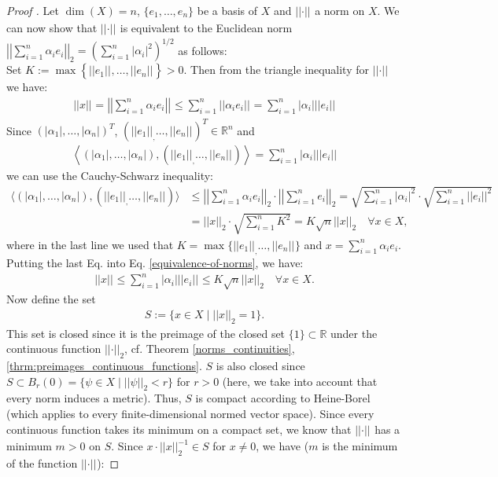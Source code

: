 \documentclass[12pt, a4paper]{article}
\numberwithin{equation}{section}
\theoremstyle{definition}
\theoremstyle{definition}
\newcommand{\norm}[2]{\left\vert\left\vert #1 \right\vert\right\vert_{#2}}
\newcommand{\abs}[1]{\left\vert #1 \right\vert}
\begin{document}
	\begin{proof}[Proof \cite{werner-fa}] Let $\dim(X) = n$, $\{e_1, \dots, e_n\}$ be a basis of $X$ and $\norm{\cdot}{}$ a norm on $X$. We can now show that $\norm{\cdot}{}$ is equivalent to the Euclidean norm $\norm{\sum_{i = 1}^n\alpha_ie_i}{2} = \left( \sum_{i = 1}^{n}\left\vert \alpha_i \right\vert^2 \right)^{1/2}$ as follows: \\[6pt] Set $K:= \max\left\{ \norm{e_1}{}, \dots, \norm{e_n}{}\right\} > 0$. Then from the triangle inequality for $\norm{\cdot}{}$ we have: 
	\begin{align}\label{equivalence-of-norms}
		\norm{x}{} = \norm{\sum_{i= 1}^{n}\alpha_ie_i}{} \leq \sum_{i= 1}^n \norm{\alpha_ie_i}{} = \sum_{i= 1}^n \abs{\alpha_i} \norm{e_i}{}
	\end{align}
	Since $(\abs{\alpha_1}, \dots, \abs{\alpha_n})^T$, $(\norm{e_1}, \dots, \norm{e_n}{})^T\in \mathbb R^n$ and 
	\begin{align}
		\left\langle \left(\abs{\alpha_1}, \dots, \abs{\alpha_n}\right), (\norm{e_1}, \dots, \norm{e_n}{} ) \right\rangle = \sum_{i = 1}^n \abs{\alpha_i}\norm{e_i}{}
	\end{align}
	we can use the Cauchy-Schwarz inequality: 
	\begin{align}
		\langle (\abs{\alpha_1}, \dots, \abs{\alpha_n}), (\norm{e_1}, \dots, \norm{e_n}{} ) \rangle &\leq \norm{\sum_{i=1}^n \alpha_ie_i}{2}\cdot \norm{\sum_{i= 1}^n e_i}{2} = \sqrt{\sum_{i = 1}^n\abs{\alpha_i}^2} \cdot \sqrt{\sum_{i = 1}^n\norm{e_i}{}^2}
		\\[8pt] &= \norm{x}{2}\cdot \sqrt{\sum_{i=1}^n K^2} = K\sqrt{n}\norm{x}{2} \quad \forall x\in X, 
	\end{align}
	where in the last line we used that $K = \max\{\norm{e_1}, \dots, \norm{e_n}{}\}$ and $x = \sum_{i = 1}^n \alpha_i e_i$. Putting the last Eq. into Eq. \eqref{equivalence-of-norms}, we have: 
	\begin{align}\label{fa_equiv_norms_intermed_1}
		\norm{x}{} \leq \sum_{i=1}^{n} \abs{\alpha_i}\norm{e_i}{} \leq K\sqrt{n}\norm{x}{2} \quad \forall x\in X.
	\end{align}
	Now define the set 
	\begin{align}
		S:= \{ x\in X \mid \norm{x}{2} = 1 \}. 
	\end{align}
	This set is closed since it is the preimage of the closed set $\{1\}\subset \mathbb R$ under the continuous function $\norm{\cdot}{2}$, cf. Theorem \ref{norms_continuities}, \ref{thrm:preimages_continuous_functions}. $S$ is also closed since $S\subset B_{r}(0) = \{\psi\in X\mid \norm{\psi}{2} < r\}$ for $r>0$ (here, we take into account that every norm induces a metric). Thus, $S$ is compact according to Heine-Borel (which applies to every finite-dimensional normed vector space). Since every continuous function takes its minimum on a compact set, we know that $\norm{\cdot}{}$ has a minimum $m > 0$ on $S$. Since $x\cdot \norm{x}{2}^{-1}\in S$ for $x\ne 0$, we have ($m$ is the minimum of the function $\norm{\cdot}{}$): 

\end{proof}
\end{document}
